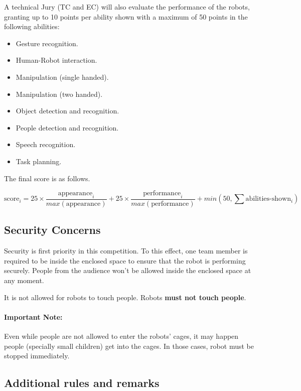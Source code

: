 A technical Jury (TC and EC) will also evaluate the performance of the robots, granting up to 10 points per ability shown with a maximum of 50 points in the following abilities:
\begin{itemize}
\item Gesture recognition.
\item Human-Robot interaction.
\item Manipulation (single handed).
\item Manipulation (two handed).
\item Object detection and recognition.
\item People detection and recognition.
\item Speech recognition.
\item Task planning.
\end{itemize}

The final score is as follows.

$$\mbox{score}_i = 25 \times \frac{\mbox{appearance}_i}{max(\mbox{appearance})} + 
25 \times \frac{\mbox{performance}_i}{max(\mbox{performance})} + min(50, \sum\mbox{abilities-shown}_i)
$$

\subsection{Security Concerns}
Security is first priority in this competition. To this effect, one team member is required to be inside the enclosed space to ensure that the robot is performing securely. People from the audience won't be allowed inside the enclosed space at any moment.

It is not allowed for robots to touch people. Robots \textbf{must not touch people}.

%
%

\paragraph*{Important Note:} Even while people are not allowed to enter the robots' cages, it may happen people (specially small children) get into the cages.  In those cases, robot must be stopped immediately.

\subsection{Additional rules and remarks}

